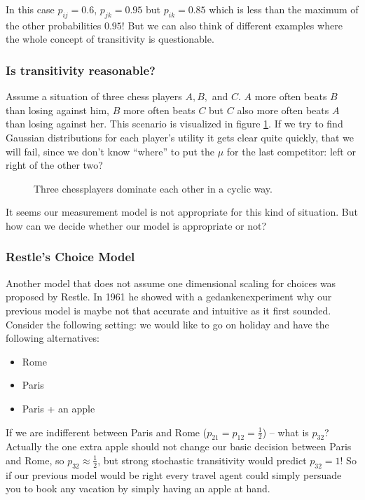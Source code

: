 \documentclass[../main/Notes.tex]{subfiles}
\begin{document}
In this case $p_{ij} = 0.6$, $p_{jk}=0.95$ but $p_{ik} = 0.85$ which is less than the maximum of the other probabilities $0.95$! But we can also think of different examples where the whole concept of transitivity is questionable.

\subsubsection*{Is transitivity reasonable?}
Assume a situation of three chess players $A, B,$ and $C$. $A$ more often beats $B$ than losing against him, $B$ more often beats $C$ but $C$ also more often beats $A$ than losing against her. This scenario is visualized in figure \ref{fig:2014-07-04-chesscycle}. If we try to find Gaussian distributions for each player's utility it gets clear quite quickly, that we will fail, since we don't know ``where'' to put the $\mu$ for the last competitor: left or right of the other two?

\begin{figure}[ht]
  \centering
  \caption{Three chessplayers dominate each other in a cyclic way.}
  \label{fig:2014-07-04-chesscycle}
\end{figure}

It seems our measurement model is not appropriate for this kind of situation. But how can we decide whether our model is appropriate or not?

\subsubsection{Restle's Choice Model}
Another model that does not assume one dimensional scaling for choices was proposed by Restle. In 1961 he showed with a gedankenexperiment why our previous model is maybe not that accurate and intuitive as it first sounded. Consider the following setting: we would like to go on holiday and have the following alternatives:
\begin{itemize}
  \item Rome
	\item Paris
  \item Paris + an apple
\end{itemize}
If we are indifferent between Paris and Rome ($p_{21} = p_{12} = \frac{1}{2}$) -- what is $p_{32}$? Actually the one extra apple should not change our basic decision between Paris and Rome, so $p_{32} \approx \frac{1}{2}$, but strong stochastic transitivity would predict $p_{32} = 1$! So if our previous model would be right every travel agent could simply persuade you to book any vacation by simply having an apple at hand.
\end{document}
